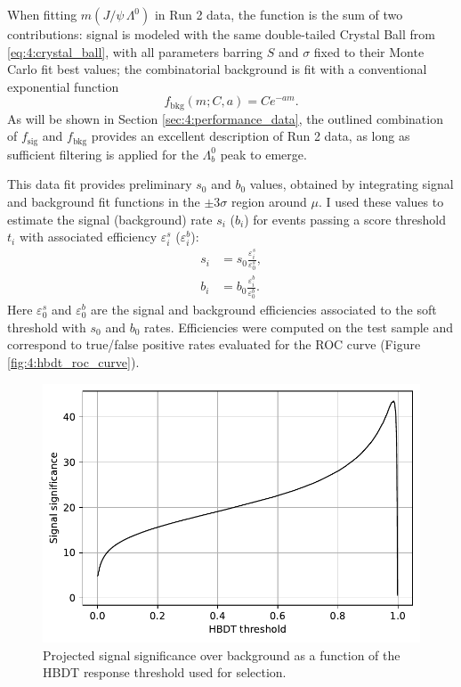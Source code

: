 When fitting $m(J/\psi\,\Lambda^0)$ in Run 2 data, the function is the sum of two contributions:
signal is modeled with the same double-tailed Crystal Ball from \eqref{eq:4:crystal_ball}, with all parameters barring $S$ and $\sigma$ fixed to their Monte Carlo fit best values;
the combinatorial background is fit with a conventional exponential function
\begin{equation}
	f_\text{bkg} (m;C,a) = C e^{-a m}.
	\label{eq:4:exponential}
\end{equation}
As will be shown in Section \ref{sec:4:performance_data}, the outlined combination of $f_\text{sig}$ and $f_\text{bkg}$ provides an excellent description of Run 2 data, as long as sufficient filtering is applied for the $\Lambda_b^0$ peak to emerge.

This data fit provides preliminary $s_0$ and $b_0$ values, obtained by integrating signal and background fit functions in the $\pm 3\sigma$ region around $\mu$.
I used these values to estimate the signal (background) rate $s_i$ ($b_i$) for events passing a score threshold $t_i$ with associated efficiency $\varepsilon_i^s$ ($\varepsilon_i^b$):
\begin{subequations}
\begin{align}
	s_i &= s_0 \frac{\varepsilon_i^s}{\varepsilon_0^s}, \\
	b_i &= b_0 \frac{\varepsilon_i^b}{\varepsilon_0^b}.
\end{align}
\end{subequations}
Here $\varepsilon_0^s$ and $\varepsilon_0^b$ are the signal and background efficiencies associated to the soft threshold with $s_0$ and $b_0$ rates.
Efficiencies were computed on the test sample and correspond to true/false positive rates evaluated for the ROC curve (Figure \ref{fig:4:hbdt_roc_curve}).

\begin{figure}
	\centering
	\includegraphics[width=.6\textwidth]{graphics/04-event_selection/HBDT_signal_significance.pdf}
	\caption{Projected \demonstratorshort signal significance over background as a function of the HBDT response threshold used for selection.}
	\label{fig:4:signal_significance}
\end{figure}

